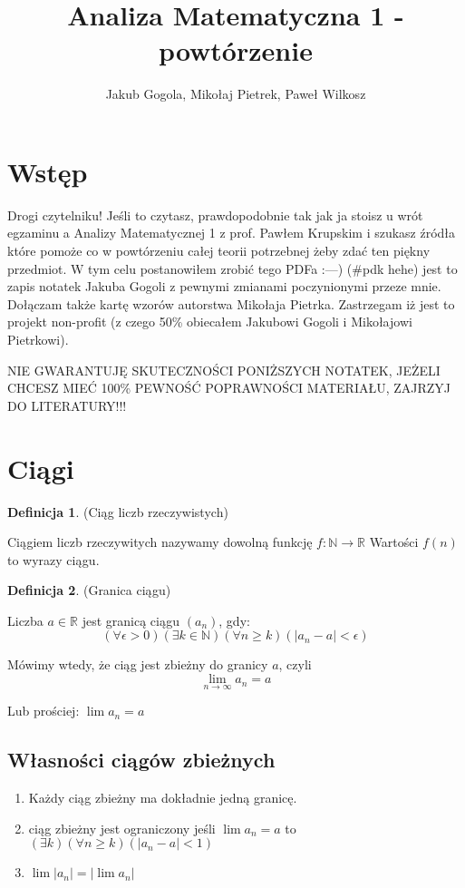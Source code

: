 \documentclass{article}
\author{Jakub Gogola, Mikołaj Pietrek, Paweł Wilkosz}
\title{Analiza Matematyczna 1 - powtórzenie}
\theoremstyle{definition}
\newtheorem{de}{Definicja}[subsection]
\theoremstyle{definition}
\theoremstyle{definition}
\begin{document}
\maketitle

\section{Wstęp}

Drogi czytelniku! Jeśli to czytasz, prawdopodobnie tak jak ja stoisz u wrót
egzaminu a Analizy Matematycznej 1 z prof. Pawłem Krupskim
i szukasz źródła które pomoże co w powtórzeniu
całej teorii potrzebnej żeby zdać ten piękny przedmiot. W tym celu postanowiłem
zrobić tego PDFa :---) (\#pdk hehe) jest to zapis notatek Jakuba Gogoli
z pewnymi zmianami poczynionymi przeze mnie. Dołączam także kartę wzorów autorstwa
Mikołaja Pietrka.
Zastrzegam iż jest to projekt non-profit
(z czego 50\% obiecałem Jakubowi Gogoli i Mikołajowi
Pietrkowi).

NIE GWARANTUJĘ SKUTECZNOŚCI PONIŻSZYCH NOTATEK, JEŻELI CHCESZ MIEĆ 100\% 
PEWNOŚĆ POPRAWNOŚCI MATERIAŁU, ZAJRZYJ DO LITERATURY!!!

\section{Ciągi}

\begin{de}
(Ciąg liczb rzeczywistych)

Ciągiem liczb rzeczywitych nazywamy dowolną funkcję
$ f: \mathbb{N} \rightarrow \mathbb{R} $
Wartości $ f(n) $ to wyrazy ciągu.
\end{de}

\begin{de}
(Granica ciągu)

Liczba $ a \in \mathbb{R} $ jest granicą ciągu $ (a_n) $, gdy:
$$
(\forall \epsilon > 0)(\exists k \in \mathbb{N})(\forall n \geq k)
(|a_n - a| < \epsilon)
$$

Mówimy wtedy, że ciąg jest zbieżny do granicy $a$, czyli
$$ \lim_{n \to \infty} a_n = a $$

Lub prościej: $ \lim a_n =a $
\end{de}

\subsection{Własności ciągów zbieżnych}

\begin{enumerate}
\item Każdy ciąg zbieżny ma dokładnie jedną granicę.
\item ciąg zbieżny jest ograniczony jeśli
      $ \lim a_n = a $ to
      $ (\exists k)(\forall n \geq k)(|a_n - a| < 1) $
\item $ \lim |a_n| = |\lim a_n| $
\end{enumerate}
\end{document}
